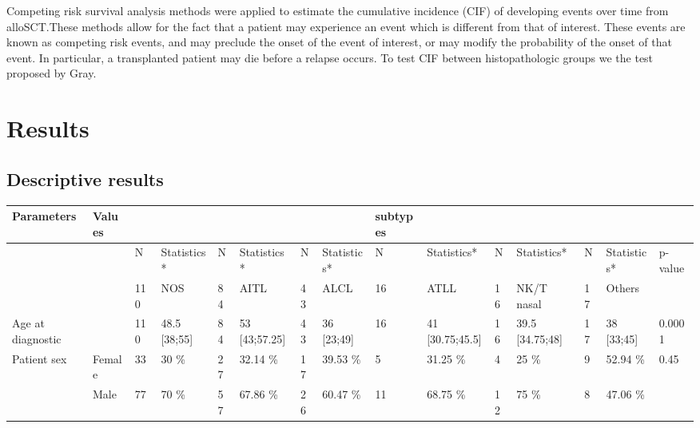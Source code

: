 \documentclass[a4paper,11pt] {article}
\begin{document}
Competing risk survival analysis methods were applied to estimate the cumulative incidence (CIF) of developing events over time from alloSCT.These methods allow for the fact that a patient may experience an event which is different from that of interest. These events are known as competing risk events, and may preclude the onset of the event of interest, or may modify the probability of the onset of that event. In particular, a transplanted patient may die before a relapse occurs.
To test CIF between histopathologic groups we the test proposed by Gray. 

\pagebreak[4]
\section{Results}




\subsection{Descriptive results }
\begin{landscape}

\begin{tabularx}{\textwidth}{llXlXlXlXlXlXll}

  \hline
Parameters & Values &  &  &  &  &  &  & subtypes &  &  &  &  &  &  \\ 
  \hline
 &  & N & Statistics* & N & Statistics* & N & Statistics* & N & Statistics* & N & Statistics* & N & Statistics* & p-value \\ 
   &  & 110 & NOS & 84 & AITL & 43 & ALCL & 16 & ATLL & 16 & NK/T nasal & 17 & Others &  \\ 
  Age at diagnostic &  & 110 & 48.5 [38;55] & 84 & 53 [43;57.25] & 43 & 36 [23;49] & 16 & 41 [30.75;45.5] & 16 & 39.5 [34.75;48] & 17 & 38 [33;45] & 0.0001 \\ 
  Patient sex & Female & 33 & 30 \% & 27 & 32.14 \% & 17 & 39.53 \% & 5 & 31.25 \% & 4 & 25 \% & 9 & 52.94 \% & 0.45 \\ 
   & Male & 77 & 70 \% & 57 & 67.86 \% & 26 & 60.47 \% & 11 & 68.75 \% & 12 & 75 \% & 8 & 47.06 \% &  \\ 
   \hline
\end{tabularx}
\end{landscape}
\end{document}
